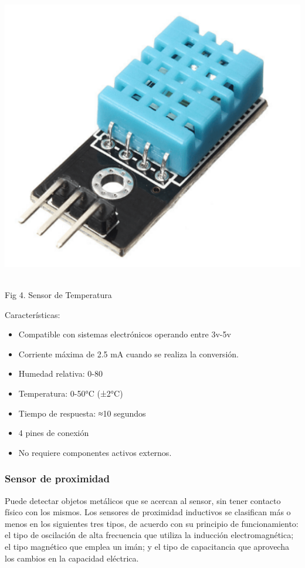 \documentclass[12pt]{report}
\begin{document}
 \begin{center}
\includegraphics[scale=0.38]{Documento/Figuras/fig5.png}
\begin{scriptsize}\\ 
Fig 4. Sensor de Temperatura
\end{scriptsize}
\end{center}

Características:
\begin{itemize}
    \item Compatible con sistemas
    electrónicos operando entre 3v-5v 
    \item Corriente máxima de 2.5 mA cuando se realiza la conversión.
    \item Humedad relativa: 0-80%
    \item Temperatura: 0-50°C (±2°C)
    \item Tiempo de respuesta: ≈10 segundos
    \item 4 pines de conexión 
    \item No requiere componentes activos externos.
\end{itemize}

\subsubsection{Sensor de proximidad}
Puede detectar objetos metálicos que se acercan al sensor, sin tener contacto físico con los mismos. Los sensores de proximidad inductivos se clasifican más o menos en los siguientes tres tipos, de acuerdo con su principio de funcionamiento: el tipo de oscilación de alta frecuencia que utiliza la inducción electromagnética; el tipo magnético que emplea un imán; y el tipo de capacitancia que aprovecha los cambios en la capacidad eléctrica.
\end{document}
